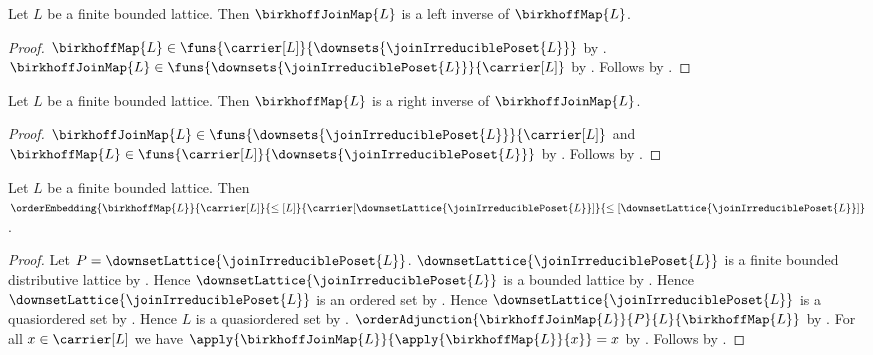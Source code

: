 \begin{proposition}\label{birkhoff_join_map_is_left_inverse}
    Let $L$ be a finite bounded lattice.
    Then $\birkhoffJoinMap{L}$ is a left inverse of $\birkhoffMap{L}$.
\end{proposition}
\begin{proof}
    $\birkhoffMap{L}\in
        \funs{\carrier[L]}{\downsets{\joinIrreduciblePoset{L}}}$ by
        .
    $\birkhoffJoinMap{L}\in
        \funs{\downsets{\joinIrreduciblePoset{L}}}{\carrier[L]}$ by
        .
    Follows by .
\end{proof}

\begin{proposition}\label{birkhoff_map_is_right_inverse_of_join_map}
    Let $L$ be a finite bounded lattice.
    Then $\birkhoffMap{L}$ is a right inverse of
        $\birkhoffJoinMap{L}$.
\end{proposition}
\begin{proof}
    $\birkhoffJoinMap{L}\in
        \funs{\downsets{\joinIrreduciblePoset{L}}}{\carrier[L]}$ and
        $\birkhoffMap{L}\in
        \funs{\carrier[L]}{\downsets{\joinIrreduciblePoset{L}}}$ by
        .
    Follows by .
\end{proof}

\begin{theorem}\label{finite_birkhoff_order_embedding}
    Let $L$ be a finite bounded lattice.
    Then
        $\orderEmbedding
            {\birkhoffMap{L}}
            {\carrier[L]}{\leq[L]}
            {\carrier[\downsetLattice{\joinIrreduciblePoset{L}}]}
            {\leq[\downsetLattice{\joinIrreduciblePoset{L}}]}$.
\end{theorem}
\begin{proof}
    Let $P=\downsetLattice{\joinIrreduciblePoset{L}}$.
    $\downsetLattice{\joinIrreduciblePoset{L}}$ is a finite bounded
        distributive lattice by
        .
    Hence $\downsetLattice{\joinIrreduciblePoset{L}}$ is a bounded
        lattice by
        .
    Hence $\downsetLattice{\joinIrreduciblePoset{L}}$ is an ordered
        set by .
    Hence $\downsetLattice{\joinIrreduciblePoset{L}}$ is a
        quasiordered set by .
    Hence $L$ is a quasiordered set by .
    $\orderAdjunction{\birkhoffJoinMap{L}}{P}{L}{\birkhoffMap{L}}$ by
        .
    For all $x\in\carrier[L]$ we have
        $\apply{\birkhoffJoinMap{L}}{\apply{\birkhoffMap{L}}{x}}=x$ by
        .
    Follows by
        .
\end{proof}

